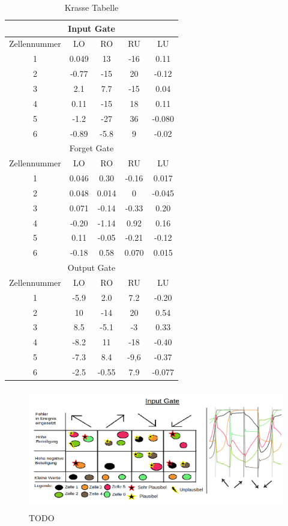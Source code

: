 \begin{table}
	\centering
\begin{tabular}{|c|c|c|c|c|}
	\hline
	\multicolumn{5}{|c|}{Input Gate} \\	\hline
	Zellennummer & LO & RO & RU & LU \\ \hline
	1 & 0.049 & 13 & -16 & 0.11 \\ \hline
	2 & -0.77 & -15 & 20 & -0.12 \\ \hline
	3 & 2.1 & 7.7 & -15 & 0.04 \\ \hline
	4 & 0.11 & -15 & 18 & 0.11 \\ \hline
	5 & -1.2 & -27 & 36   & -0.080 \\ \hline
	6 & -0.89 & -5.8 & 9   & -0.02 \\ \hline\hline
	\multicolumn{5}{|c|}{Forget Gate} \\	\hline
	Zellennummer & LO & RO & RU & LU  \\ \hline
	1 & 0.046 & 0.30 & -0.16 & 0.017 \\ \hline
	2 & 0.048 & 0.014 & 0 & -0.045 \\ \hline
	3 & 0.071 & -0.14 & -0.33 & 0.20 \\ \hline
	4 & -0.20 & -1.14 & 0.92 & 0.16 \\ \hline
	5 & 0.11 & -0.05 & -0.21   & -0.12 \\ \hline
	6 & -0.18 & 0.58 & 0.070   & 0.015 \\ \hline\hline
	\multicolumn{5}{|c|}{Output Gate} \\	\hline
	Zellennummer & LO & RO & RU & LU \\ \hline
	1 & -5.9 & 2.0 & 7.2 & -0.20 \\ \hline
	2 & 10 & -14 & 20 & 0.54 \\ \hline
	3 & 8.5 & -5.1 & -3 & 0.33 \\ \hline
	4 & -8.2 & 11 & -18 & -0.40 \\ \hline
	5 & -7.3 & 8.4 & -9,6   & -0.37 \\ \hline
	6 & -2.5 & -0.55 & 7.9   & -0.077 \\ \hline\hline
\end{tabular}
\caption{Krasse Tabelle}
\end{table}
\begin{figure}
	\centering
	\includegraphics[width=\textwidth, height=200px]{pics/inputgate.png}	
	\caption{TODO }
	\label{img:inputgate}
\end{figure}
